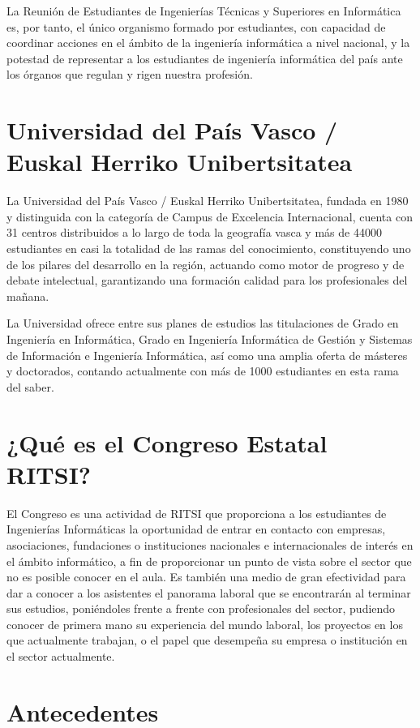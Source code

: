 \documentclass[11pt]{ritsi/article}
\begin{document}
La Reunión de Estudiantes de Ingenierías Técnicas y Superiores en Informática es, por tanto, el único organismo formado por estudiantes, con capacidad de coordinar acciones en el ámbito de la ingeniería informática a nivel nacional, y la potestad de representar a los estudiantes de ingeniería informática del país ante los órganos que regulan y rigen nuestra profesión.

\section{Universidad del País Vasco / Euskal Herriko Unibertsitatea}

La Universidad del País Vasco / Euskal Herriko Unibertsitatea, fundada en 1980 y distinguida con la categoría de Campus de Excelencia Internacional, cuenta con 31 centros distribuidos a lo largo de toda la geografía vasca y más de 44000 estudiantes en casi la totalidad de las ramas del conocimiento, constituyendo uno de los pilares del desarrollo en la región, actuando como motor de progreso y de debate intelectual, garantizando una formación calidad para los profesionales del mañana.

La Universidad ofrece entre sus planes de estudios las titulaciones de Grado en Ingeniería en Informática, Grado en Ingeniería Informática de Gestión y Sistemas de Información e Ingeniería Informática, así como una amplia oferta de másteres y doctorados, contando actualmente con más de 1000 estudiantes en esta rama del saber.

\section{¿Qué es el Congreso Estatal RITSI?}
El Congreso es una actividad de RITSI que proporciona a los estudiantes de Ingenierías Informáticas la oportunidad de entrar en contacto con empresas, asociaciones, fundaciones o instituciones nacionales e internacionales de interés en el ámbito informático, a fin de proporcionar un punto de vista sobre el sector que no es posible conocer en el aula. Es también una medio de gran efectividad para dar a conocer a los asistentes el panorama laboral que se encontrarán al terminar sus estudios, poniéndoles frente a frente con profesionales del sector, pudiendo conocer de primera mano su experiencia del mundo laboral, los proyectos en los que actualmente trabajan, o el papel que desempeña su empresa o institución en el sector actualmente.

\section{Antecedentes}
\end{document}
